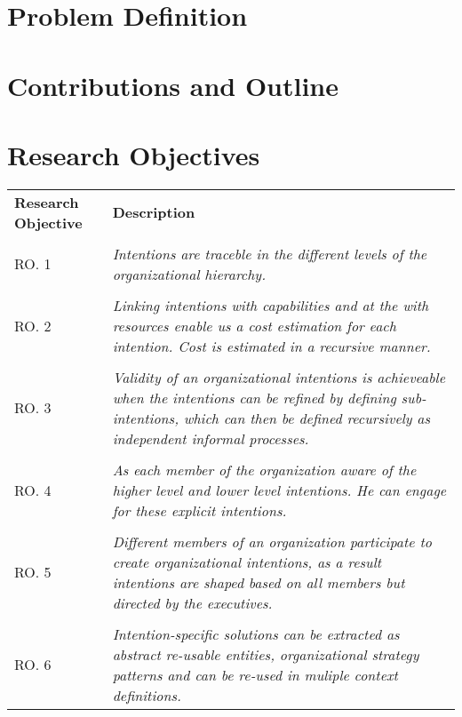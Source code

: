 \section{Problem Definition}

\section{Contributions and Outline}

\section {Research Objectives}
\label{sec:researchobj}

\begin{tabular}{p{5cm}p{11cm}} 
	\textbf{Research Objective} & \textbf{Description} \\
	\\
	RO. 1 & \textit{Intentions are traceble in the different levels of the organizational hierarchy. } \label{ro1} \\
	\\[-1.5ex]
	RO. 2 & \textit{Linking intentions with capabilities and at the with resources enable us a cost estimation for each intention. Cost is estimated in a recursive manner.} \label{ro2} \\
	\\[-1.5ex]
	RO. 3 & \textit{Validity of an organizational intentions is achieveable when the intentions can be refined by defining sub-intentions, which can then be defined recursively as independent informal processes.} \label{ro3}\\
	\\[-1.5ex]
	RO. 4 & \textit{As each member of the organization aware of the higher level and lower level intentions. He can engage for these explicit intentions. } \label{ro4}\\
	\\[-1.5ex]
	RO. 5 & \textit{Different members of an organization participate to create organizational intentions, as a result intentions are shaped based on all members but directed by the executives.} \label{ro5}\\
	\\[-1.5ex]
	RO. 6 & \textit{Intention-specific solutions can be extracted as abstract re-usable entities, organizational strategy patterns and can be re-used in muliple context definitions.} \label{ro6}\\
\end{tabular}
